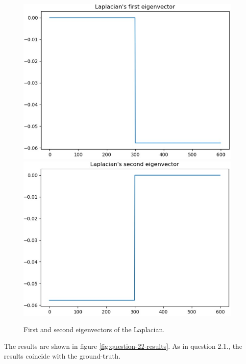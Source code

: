 \documentclass[a4paper, 11pt]{report}
\begin{document}
    \begin{figure}[!h]
        \centering
        \includegraphics[scale=0.55]{images/two_blobs_22_first_eigenvector.jpg}
        \hfill
        \includegraphics[scale=0.55]{images/two_blobs_22_second_eigenvector.jpg}
        \caption{First and second eigenvectors of the Laplacian.}
        \label{fig:two-blobs-22-eigenvectors}
    \end{figure}

    The results are shown in figure \ref{fig:question-22-results}. As in question 2.1., the results coincide with the ground-truth.
    
\end{document}
